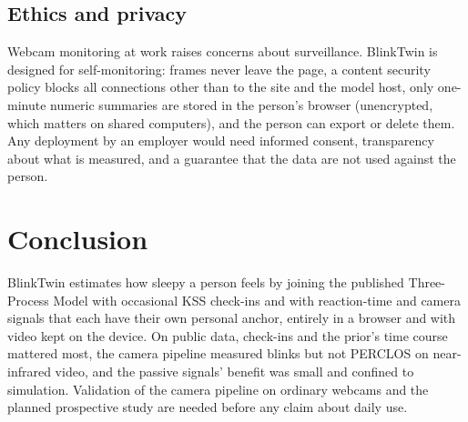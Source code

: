 \subsection{Ethics and privacy}
Webcam monitoring at work raises concerns about surveillance. BlinkTwin is designed for self-monitoring: frames never leave the page, a content security policy blocks all connections other than to the site and the model host, only one-minute numeric summaries are stored in the person's browser (unencrypted, which matters on shared computers), and the person can export or delete them. Any deployment by an employer would need informed consent, transparency about what is measured, and a guarantee that the data are not used against the person.

\section{Conclusion}
\label{sec:conclusion}
BlinkTwin estimates how sleepy a person feels by joining the published Three-Process Model with occasional KSS check-ins and with reaction-time and camera signals that each have their own personal anchor, entirely in a browser and with video kept on the device. On public data, check-ins and the prior's time course mattered most, the camera pipeline measured blinks but not PERCLOS on near-infrared video, and the passive signals' benefit was small and confined to simulation. Validation of the camera pipeline on ordinary webcams and the planned prospective study are needed before any claim about daily use.
